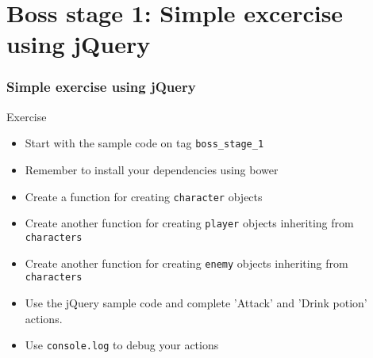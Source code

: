 \section{Boss stage 1: Simple excercise using jQuery}

\begin{frame}[fragile]
\end{frame}

\begin{frame}[fragile]
  \frametitle{Simple exercise using jQuery}
  \begin{block}{Exercise}
    \begin{itemize}
      \item Start with the sample code on tag \texttt{boss\_stage\_1}
      \item Remember to install your dependencies using bower
      \item Create a function for creating \texttt{character} objects
      \item Create another function for creating \texttt{player} objects inheriting from \texttt{characters}
      \item Create another function for creating \texttt{enemy} objects inheriting from \texttt{characters}
      \item Use the jQuery sample code and complete 'Attack' and 'Drink potion' actions.
      \item Use \texttt{console.log} to debug your actions
    \end{itemize}
  \end{block}
\end{frame}
